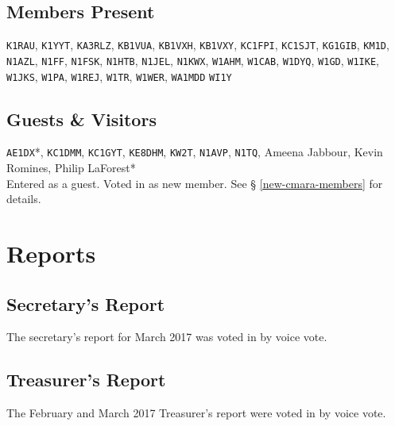 \documentclass[10pt,letterpaper]{article}
\begin{document}
\subsection{Members Present}
\texttt{K1RAU},
\texttt{K1YYT},
\texttt{KA3RLZ},
\texttt{KB1VUA},
\texttt{KB1VXH},
\texttt{KB1VXY},
\texttt{KC1FPI},
\texttt{KC1SJT},
\texttt{KG1GIB},
\texttt{KM1D},
\texttt{N1AZL},
\texttt{N1FF},
\texttt{N1FSK},
\texttt{N1HTB},
\texttt{N1JEL},
\texttt{N1KWX},
\texttt{W1AHM},
\texttt{W1CAB},
\texttt{W1DYQ},
\texttt{W1GD},
\texttt{W1IKE},
\texttt{W1JKS},
\texttt{W1PA},
\texttt{W1REJ},
\texttt{W1TR},
\texttt{W1WER},
\texttt{WA1MDD}
\texttt{WI1Y}

\subsection{Guests \& Visitors}
\texttt{AE1DX}*,
\texttt{KC1DMM},
\texttt{KC1GYT},
\texttt{KE8DHM},
\texttt{KW2T},
\texttt{N1AVP},
\texttt{N1TQ},
Ameena Jabbour,
Kevin Romines,
Philip LaForest*\\

\noindent
\textasteriskcentered{} Entered as a guest. Voted in as new member. See \S{} \ref{new-cmara-members} for details.

\section{Reports}

\subsection{Secretary's Report}
The secretary's report for March 2017 was voted in by voice vote.

\newpage
\subsection{Treasurer's Report}
The February and March 2017 Treasurer's report were voted in by voice vote.
\end{document}
